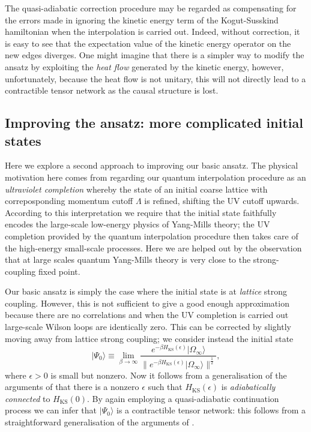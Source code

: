 \documentclass[twocolumn,lengthcheck,superscriptaddress]{revtex4-1}
\theoremstyle{definition}
\theoremstyle{remark}
\begin{document}
The quasi-adiabatic correction procedure may be regarded as compensating for the errors made in ignoring the kinetic energy term of the Kogut-Susskind hamiltonian when the interpolation is carried out. Indeed, without correction, it is easy to see that the expectation value of the kinetic energy operator on the new edges diverges. One might imagine that there is a simpler way to modify the ansatz by exploiting the \emph{heat flow} generated by the kinetic energy, however, unfortunately, because the heat flow is not unitary, this will not directly lead to a contractible tensor network as the causal structure is lost. 

\subsection{Improving the ansatz: more complicated initial states}
Here we explore a second approach to improving our basic ansatz. The physical motivation here comes from regarding our quantum interpolation procedure as an \emph{ultraviolet completion} whereby the state of an initial coarse lattice with correposponding momentum cutoff $\Lambda$ is refined, shifting the UV cutoff upwards. According to this interpretation we require that the initial state faithfully encodes the large-scale low-energy physics of Yang-Mills theory; the UV completion provided by the quantum interpolation procedure then takes care of the high-energy small-scale processes. Here we are helped out by the observation that at large scales quantum Yang-Mills theory is very close to the strong-coupling fixed point. 

Our basic ansatz is simply the case where the initial state is at \emph{lattice} strong coupling. However, this is not sufficient to give a good enough approximation because there are no correlations and when the UV completion is carried out large-scale Wilson loops are identically zero. This can be corrected by slightly moving away from lattice strong coupling; we consider instead the initial state
\begin{equation}
	|\Psi_0\rangle \equiv \lim_{\beta\rightarrow\infty} \frac{e^{-\beta H_{\text{KS}}(\epsilon)}|\Omega_\infty\rangle}{\|e^{-\beta H_{\text{KS}}(\epsilon)}|\Omega_\infty\rangle\|^{\frac12}},
\end{equation}    
where $\epsilon > 0$ is small but nonzero. Now it follows from a generalisation of the arguments of \cite{bravyi:2010c,michalakis:2013a} that there is a nonzero $\epsilon$ such that $H_{\text{KS}}(\epsilon)$ is \emph{adiabatically connected} to $H_{\text{KS}}(0)$. By again employing a quasi-adiabatic continuation process we can infer that $|\Psi_0\rangle$ is a contractible tensor network: this follows from a straightforward generalisation of the arguments of \cite{osborne:2006a,wen:2005a}. 
\end{document}
